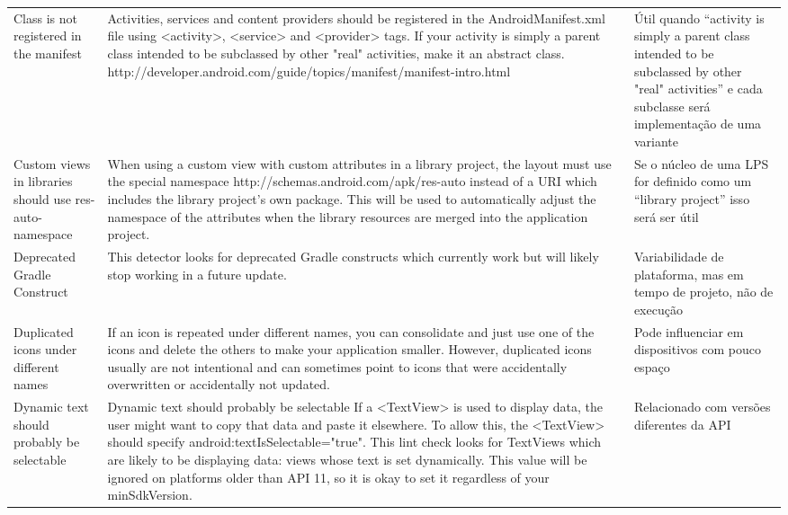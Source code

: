 \begin{landscape}
\begin{longtable}{p{30mm}|p{180mm}|p{25mm}}
Class is not registered in the manifest
&Activities, services and content providers should be registered in the AndroidManifest.xml file using <activity>, <service> and <provider> tags. If your activity is simply a parent class intended to be subclassed by other "real" activities, make it an abstract class. http://developer.android.com/guide/topics/manifest/manifest-intro.html
&Útil quando “activity is simply a parent class intended to be subclassed by other "real" activities” e cada subclasse será implementação de uma variante\\

Custom views in libraries should use res-auto-namespace
&When using a custom view with custom attributes in a library project, the layout must use the special namespace http://schemas.android.com/apk/res-auto instead of a URI which includes the library project's own package. This will be used to automatically adjust the namespace of the attributes when the library resources are merged into the application project.
&Se o núcleo de uma LPS for definido como um “library project” isso será ser útil\\

Deprecated Gradle Construct
&This detector looks for deprecated Gradle constructs which currently work but will likely stop working in a future update.
&Variabilidade de plataforma, mas em tempo de projeto, não de execução\\

Duplicated icons under different names
&If an icon is repeated under different names, you can consolidate and just use one of the icons and delete the others to make your application smaller. However, duplicated icons usually are not intentional and can sometimes point to icons that were accidentally overwritten or accidentally not updated.
&Pode influenciar em dispositivos com pouco espaço\\

Dynamic text should probably be selectable
&Dynamic text should probably be selectable If a <TextView> is used to display data, the user might want to copy that data and paste it elsewhere. To allow this, the <TextView> should specify android:textIsSelectable="true". This lint check looks for TextViews which are likely to be displaying data: views whose text is set dynamically. This value will be ignored on platforms older than API 11, so it is okay to set it regardless of your minSdkVersion.
&Relacionado com versões diferentes da API\\


\end{longtable}
\end{landscape}
